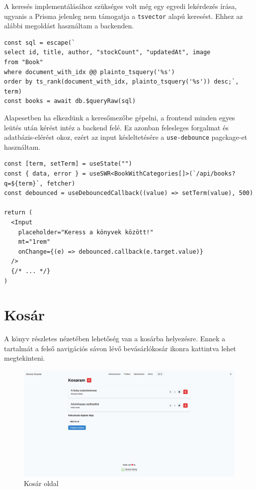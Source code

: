 A keresés implementálásához szükséges volt még egy egyedi lekérdezés írása, ugyanis a Prisma jelenleg nem támogatja a \lstinline|tsvector|
alapú keresést. Ehhez az alábbi megoldást használtam a backenden.

\begin{lstlisting}[caption=Könyvek közti keresés megvalósítása]
const sql = escape(`
select id, title, author, "stockCount", "updatedAt", image
from "Book"
where document_with_idx @@ plainto_tsquery('%s')
order by ts_rank(document_with_idx, plainto_tsquery('%s')) desc;`, term)
const books = await db.$queryRaw(sql)
\end{lstlisting}

Alapesetben ha elkezdünk a keresőmezőbe gépelni, a frontend minden egyes leütés után kérést intéz a backend felé.
Ez azonban felesleges forgalmat és adatbázis-elérést okoz, ezért az input késleltetésére a \lstinline|use-debounce| pagckage-et használtam.

\begin{lstlisting}[caption=A keresést megvalósító kódrészlet a frontenden]
const [term, setTerm] = useState("")
const { data, error } = useSWR<BookWithCategories[]>(`/api/books?q=${term}`, fetcher)
const debounced = useDebouncedCallback((value) => setTerm(value), 500)

return (
  <Input
    placeholder="Keress a könyvek között!"
    mt="1rem"
    onChange={(e) => debounced.callback(e.target.value)}
  />
  {/* ... */}
)
\end{lstlisting}

\section{Kosár}

A könyv részletes nézetében lehetőség van a kosárba helyezésre. Ennek a tartalmát a felső navigációs sávon lévő bevásárlókosár
ikonra kattintva lehet megtekinteni.

\begin{figure}[!ht]
  \centering
  \includegraphics[width=150mm, keepaspectratio]{figures/cart.png}
  \caption{Kosár oldal}
  \label{fig:CartPage}
\end{figure}

